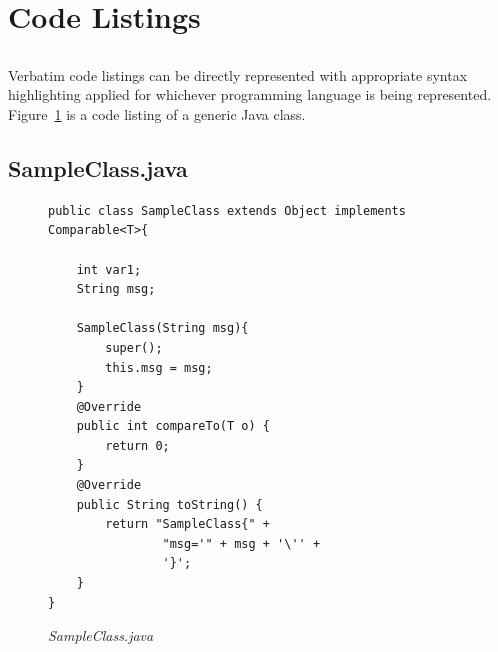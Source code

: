 \documentclass[a4paper,10pt]{article}
\begin{document}
\newpage
\section{Code Listings}\label{code}
\subsection{}Verbatim code listings can be directly represented with appropriate syntax highlighting applied for whichever programming language is being represented. Figure~\ref{java} is a code listing of a generic Java class.

\subsection{SampleClass.java}
\begin{figure}[!h]
	\begin{lstlisting}
public class SampleClass extends Object implements Comparable<T>{
    
    int var1;
    String msg;
    
    SampleClass(String msg){
        super();
        this.msg = msg;
    }
    @Override
    public int compareTo(T o) {
        return 0;
    }
    @Override
    public String toString() {
        return "SampleClass{" +
                "msg='" + msg + '\'' +
                '}';
    }
}
	\end{lstlisting}
	\caption{\textit{SampleClass.java}}
	\label{java}
\end{figure}
\end{document}
